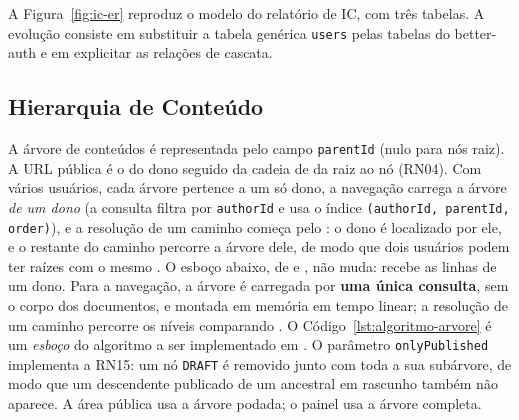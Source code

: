 
A Figura~\ref{fig:ic-er} reproduz o modelo do relatório de IC, com três tabelas. A evolução consiste em substituir a tabela genérica \texttt{users} pelas tabelas do better-auth e em explicitar as relações de cascata.


\subsection{Hierarquia de Conteúdo}\label{sec:arq-hierarquia}

A árvore de conteúdos é representada pelo campo \texttt{parentId} (nulo para nós raiz). A URL pública é o  do dono seguido da cadeia de  da raiz ao nó (RN04). Com vários usuários, cada árvore pertence a um só dono, a navegação carrega a árvore \emph{de um dono} (a consulta filtra por \texttt{authorId} e usa o índice \texttt{(authorId, parentId, order)}), e a resolução de um caminho começa pelo : o dono é localizado por ele, e o restante do caminho percorre a árvore dele, de modo que dois usuários podem ter raízes com o mesmo . O esboço abaixo, de  e , não muda: recebe as linhas de um dono. Para a navegação, a árvore é carregada por \textbf{uma única consulta}, sem o corpo dos documentos, e montada em memória em tempo linear; a resolução de um caminho percorre os níveis comparando . O Código~\ref{lst:algoritmo-arvore} é um \emph{esboço} do algoritmo a ser implementado em . O parâmetro \texttt{onlyPublished} implementa a RN15: um nó \texttt{DRAFT} é removido junto com toda a sua subárvore, de modo que um descendente publicado de um ancestral em rascunho também não aparece. A área pública usa a árvore podada; o painel usa a árvore completa.

